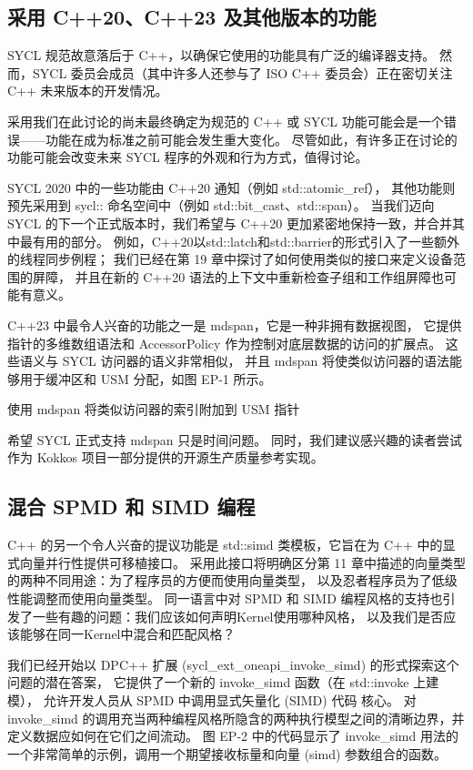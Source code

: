 \subsection{采用 C++20、C++23 及其他版本的功能}
SYCL 规范故意落后于 C++，以确保它使用的功能具有广泛的编译器支持。 
然而，SYCL 委员会成员（其中许多人还参与了 ISO C++ 委员会）正在密切关注 C++ 未来版本的开发情况。

采用我们在此讨论的尚未最终确定为规范的 C++ 或 SYCL 功能可能会是一个错误——功能在成为标准之前可能会发生重大变化。 
尽管如此，有许多正在讨论的功能可能会改变未来 SYCL 程序的外观和行为方式，值得讨论。

SYCL 2020 中的一些功能由 C++20 通知（例如 std::atomic\_ref），
其他功能则预先采用到 sycl:: 命名空间中（例如 std::bit\_cast、std::span）。 
当我们迈向 SYCL 的下一个正式版本时，我们希望与 C++20 更加紧密地保持一致，并合并其中最有用的部分。 
例如，C++20以std::latch和std::barrier的形式引入了一些额外的线程同步例程； 
我们已经在第 19 章中探讨了如何使用类似的接口来定义设备范围的屏障，
并且在新的 C++20 语法的上下文中重新检查子组和工作组屏障也可能有意义。

C++23 中最令人兴奋的功能之一是 mdspan，它是一种非拥有数据视图，
它提供指针的多维数组语法和 AccessorPolicy 作为控制对底层数据的访问的扩展点。 
这些语义与 SYCL 访问器的语义非常相似，
并且 mdspan 将使类似访问器的语法能够用于缓冲区和 USM 分配，如图 EP-1 所示。

{\color{red} 使用 mdspan 将类似访问器的索引附加到 USM 指针}

希望 SYCL 正式支持 mdspan 只是时间问题。 
同时，我们建议感兴趣的读者尝试作为 Kokkos 项目一部分提供的开源生产质量参考实现。

\subsection{混合 SPMD 和 SIMD 编程}
C++ 的另一个令人兴奋的提议功能是 std::simd 类模板，它旨在为 C++ 中的显式向量并行性提供可移植接口。 
采用此接口将明确区分第 11 章中描述的向量类型的两种不同用途：为了程序员的方便而使用向量类型，
以及忍者程序员为了低级性能调整而使用向量类型。 
同一语言中对 SPMD 和 SIMD 编程风格的支持也引发了一些有趣的问题：我们应该如何声明Kernel使用哪种风格，
以及我们是否应该能够在同一Kernel中混合和匹配风格？

我们已经开始以 DPC++ 扩展 (sycl\_ext\_oneapi\_invoke\_simd) 的形式探索这个问题的潜在答案，
它提供了一个新的 invoke\_simd 函数（在 std::invoke 上建模），
允许开发人员从 SPMD 中调用显式矢量化 (SIMD) 代码 核心。 
对invoke\_simd 的调用充当两种编程风格所隐含的两种执行模型之间的清晰边界，并定义数据应如何在它们之间流动。 
图 EP-2 中的代码显示了 invoke\_simd 用法的一个非常简单的示例，调用一个期望接收标量和向量 (simd) 参数组合的函数。

